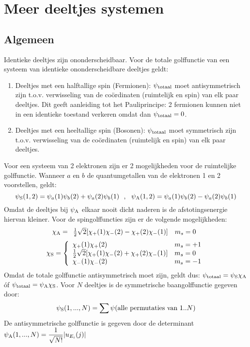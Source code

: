\documentclass[twoside]{report}
\begin{document}
\section[~~Meer deeltjes systemen]{Meer deeltjes systemen}
\subsection[~~Algemeen]{Algemeen}
Identieke deeltjes zijn ononderscheidbaar. Voor de totale golffunctie van een
systeem van identieke ononderscheidbare deeltjes geldt:
\begin{enumerate}
\item Deeltjes met een halftallige spin (Fermionen): $\psi_{\rm totaal}$
      moet antisymmetrisch zijn t.o.v. verwisseling van de co\"ordinaten
      (ruimtelijk en spin) van elk paar deeltjes. Dit geeft aanleiding tot
      het Pauliprincipe: 2 fermionen kunnen niet in een identieke
      toestand verkeren omdat dan $\psi_{\rm totaal}=0$.
\item Deeltjes met een heeltallige spin (Bosonen): $\psi_{\rm totaal}$
      moet symmetrisch zijn t.o.v. verwisseling van de co\"ordinaten
      (ruimtelijk en spin) van elk paar deeltjes.
\end{enumerate}
Voor een systeem van 2 elektronen zijn er 2 mogelijkheden voor de
ruimtelijke golffunctie. Wanneer $a$ en $b$ de quantumgetallen van de
elektronen 1 en 2 voorstellen, geldt:
\[
\psi_{\rm S}(1,2)=\psi_a(1)\psi_b(2)+\psi_a(2)\psi_b(1)~~,~~
\psi_{\rm A}(1,2)=\psi_a(1)\psi_b(2)-\psi_a(2)\psi_b(1)
\]
Omdat de deeltjes bij $\psi_{\rm A}$ elkaar nooit dicht naderen is de
afstotingsenergie hiervan kleiner. Voor de spingolffuncties zijn er de
volgende mogelijkheden:
\[
\chi_{\rm A}=
\begin{array}{ll}
\mbox{$\frac{1}{2}$}\sqrt{2}[\chi_+(1)\chi_-(2)-\chi_+(2)\chi_-(1)]&m_s=0
\end{array}
\]
\[
\chi_{\rm S}=
\left\{\begin{array}{ll}
\chi_+(1)\chi_+(2)&m_s=+1\\
\mbox{$\frac{1}{2}$}\sqrt{2}[\chi_+(1)\chi_-(2)+\chi_+(2)\chi_-(1)]&m_s=0\\
\chi_-(1)\chi_-(2)&m_s=-1
\end{array}\right.
\]
Omdat de totale golffunctie antisymmetrisch moet zijn, geldt dus:
$\psi_{\rm totaal}=\psi_{\rm S}\chi_{\rm A}$ \'of
$\psi_{\rm totaal}=\psi_{\rm A}\chi_{\rm S}$.
\npar
Voor $N$ deeltjes is de symmetrische baangolffunctie gegeven door:
\[
\psi_{\rm S}(1,...,N)=\sum\psi(\mbox{alle permutaties van }1..N)
\]
De antisymmetrische golffunctie is gegeven door de determinant
$\displaystyle\psi_{\rm A}(1,...,N)=\frac{1}{\sqrt{N!}}|u_{E_i}(j)|$
\end{document}
